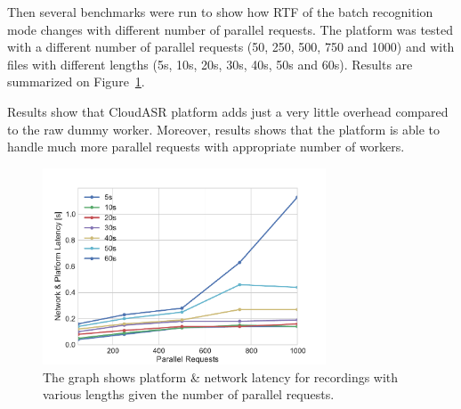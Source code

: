 Then several benchmarks were run to show how RTF of the batch recognition mode changes with different number of parallel requests.
The platform was tested with a different number of parallel requests (50, 250, 500, 750 and 1000)
  and with files with different lengths (5s, 10s, 20s, 30s, 40s, 50s and 60s).
Results are summarized on Figure~\ref{fig:parallel-benchmark}.

Results show that CloudASR platform adds just a very little overhead compared to the raw dummy worker.
Moreover, results shows that the platform is able to handle much more parallel requests with appropriate number of workers.


\begin{figure}
  \centering
  \includegraphics[width=0.75\textwidth]{./img/parallel.pdf}

  \caption{
    The graph shows platform \& network latency for recordings with various lengths
      given the number of parallel requests.
  }
  \label{fig:parallel-benchmark}
\end{figure}
